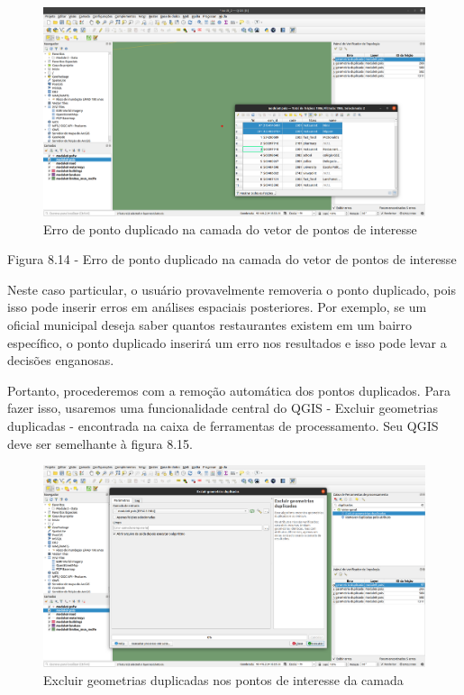 \documentclass[
]{book}
\begin{document}
\begin{figure}
\centering
\includegraphics{media/modulo8/fig814.png}
\caption{Erro de ponto duplicado na camada do vetor de pontos de interesse}
\end{figure}

Figura 8.14 - Erro de ponto duplicado na camada do vetor de pontos de interesse

Neste caso particular, o usuário provavelmente removeria o ponto duplicado, pois isso pode inserir erros em análises espaciais posteriores. Por exemplo, se um oficial municipal deseja saber quantos restaurantes existem em um bairro específico, o ponto duplicado inserirá um erro nos resultados e isso pode levar a decisões enganosas.

Portanto, procederemos com a remoção automática dos pontos duplicados. Para fazer isso, usaremos uma funcionalidade central do QGIS - Excluir geometrias duplicadas - encontrada na caixa de ferramentas de processamento. Seu QGIS deve ser semelhante à figura 8.15.

\begin{figure}
\centering
\includegraphics{media/modulo8/fig815.png}
\caption{Excluir geometrias duplicadas nos pontos de interesse da camada}
\end{figure}
\end{document}

